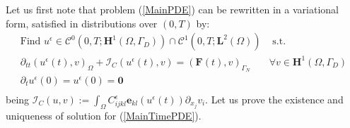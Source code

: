 Let us first note that problem (\ref{MainPDE}) can be rewritten in a variational form, satisfied in distributions over $(0,T)$ by: 
\begin{equation}
    \label{MainTimePDE}
    \begin{array}{cc}
        \text{Find } u^{\epsilon} \in \mathcal{C}^0 (0,T;\mathbf{H}^1(\Omega,\Gamma_D)) \cap \mathcal{C}^1(0,T;\mathbf{L}^2(\Omega)) & \text{ s.t. }\\
        \partial_{tt} (u^{\epsilon}(t),v)_{\Omega} + \mathcal{I}_{C}(u^{\epsilon}(t),v) = (\mathbf{F}(t),v)_{\Gamma_N}&  \forall v \in \mathbf{H}^1(\Omega,\Gamma_D) \\
        \partial_{t} u^{\epsilon}(0) = u^{\epsilon}(0) = \mathbf{0} & \\
    \end{array}
\end{equation}
being $\mathcal{I}_{C}(u,v) := \int_{\Omega} C_{ijkl}^{\epsilon}\mathbf{e}_{kl}(u^{\epsilon}(t)) \partial_{x_j} v_i$.
Let us prove the existence and uniqueness of solution for (\ref{MainTimePDE}).
